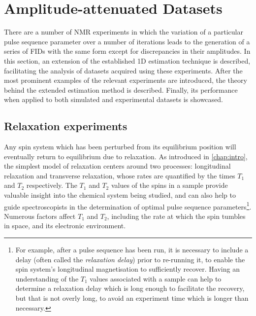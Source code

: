 \section{Amplitude-attenuated Datasets}
\label{sec:seq}
There are a number of \ac{NMR} experiments in which the
variation of a particular pulse sequence parameter over a number of iterations
leads to the generation of a series of
\acp{FID} with the same form except for discrepancies in their amplitudes.
In this section, an extension of the established \ac{1D} estimation
technique is described, facilitating the analysis of datasets acquired using
these experiments.
After the most prominent examples of the relevant experiments are
introduced, the theory behind the extended estimation method is described.
Finally, its performance when applied to both simulated and experimental
datasets is showcased.

\subsection{Relaxation experiments}
\label{subsec:relaxation_experiments}
Any spin system which has been perturbed from its equilibrium position will
eventually return to equilibrium due to relaxation. As introduced in
\cref{chap:intro}, the simplest model of relaxation centers around two
processes: longitudinal relaxation and transverse relaxation, whose rates are
quantified by the times $T_1$ and  $T_2$ respectively.
The $T_1$ and $T_2$ values of the spins in a sample provide valuable insight
into the chemical system being studied, and can also help to guide spectroscopists
in the determination of optimal pulse sequence parameters\footnote{
    For example, after a pulse sequence has been run, it is necessary to include a
    delay (often called the \emph{relaxation delay}) prior to
    re-running it, to enable the spin system's longitudinal magnetisation to
    sufficiently recover. Having an understanding of the $T_1$ values
    associated with a sample can help to determine a relaxation delay which is
    long enough to facilitate the recovery, but that is not overly long, to
    avoid an experiment time which is longer than necessary.
}.
Numerous factors affect $T_1$ and  $T_2$, including the rate at which the spin
tumbles in space, and its electronic environment.

